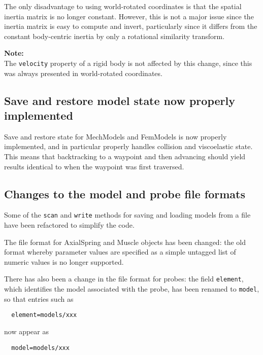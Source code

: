 \documentclass{article}
\begin{document}
The only disadvantage to using world-rotated coordinates is that the
spatial inertia matrix is no longer constant. However, this is not a
major issue since the inertia matrix is easy to compute and invert,
particularly since it differs from the constant body-centric inertia
by only a rotational similarity transform.

\begin{sideblock}
{\bf Note:}\\
The {\tt velocity} property of a rigid body is not affected
by this change, since this was always presented in
world-rotated coordinates.
\end{sideblock}

\subsection*{Save and restore model state now properly implemented}

Save and restore state for MechModels and FemModels is now properly
implemented, and in particular properly handles collision and
viscoelastic state. This means that backtracking to a waypoint and
then advancing should yield results identical to when the waypoint was
first traversed.

\subsection*{Changes to the model and probe file formats}

Some of the {\tt scan} and {\tt write} methods for saving and loading models
from a file have been refactored to simplify the code. 

The file format for AxialSpring and Muscle objects has been changed:
the old format whereby parameter values are specified as a simple
untagged list of numeric values is no longer supported.

There has also been a change in the file format for probes: the field
{\tt element}, which identifies the model associated with the probe, has been
renamed to {\tt model}, so that entries such as

\begin{verbatim}
  element=models/xxx
\end{verbatim}

now appear as

\begin{verbatim}
  model=models/xxx
\end{verbatim}
\end{document}

